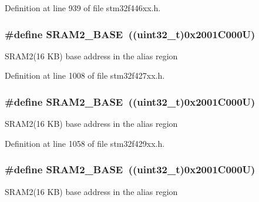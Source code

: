 Definition at line 939 of file stm32f446xx.\+h.

\subsubsection[{\texorpdfstring{S\+R\+A\+M2\+\_\+\+B\+A\+SE}{SRAM2_BASE}}]{\setlength{\rightskip}{0pt plus 5cm}\#define S\+R\+A\+M2\+\_\+\+B\+A\+SE~((uint32\+\_\+t)0x2001\+C000\+U)}\hypertarget{group___peripheral__memory__map_gadbb42a3d0a8a90a79d2146e4014241b1}{}\label{group___peripheral__memory__map_gadbb42a3d0a8a90a79d2146e4014241b1}
S\+R\+A\+M2(16 K\+B) base address in the alias region 

Definition at line 1008 of file stm32f427xx.\+h.

\subsubsection[{\texorpdfstring{S\+R\+A\+M2\+\_\+\+B\+A\+SE}{SRAM2_BASE}}]{\setlength{\rightskip}{0pt plus 5cm}\#define S\+R\+A\+M2\+\_\+\+B\+A\+SE~((uint32\+\_\+t)0x2001\+C000\+U)}\hypertarget{group___peripheral__memory__map_gadbb42a3d0a8a90a79d2146e4014241b1}{}\label{group___peripheral__memory__map_gadbb42a3d0a8a90a79d2146e4014241b1}
S\+R\+A\+M2(16 K\+B) base address in the alias region 

Definition at line 1058 of file stm32f429xx.\+h.

\subsubsection[{\texorpdfstring{S\+R\+A\+M2\+\_\+\+B\+A\+SE}{SRAM2_BASE}}]{\setlength{\rightskip}{0pt plus 5cm}\#define S\+R\+A\+M2\+\_\+\+B\+A\+SE~((uint32\+\_\+t)0x2001\+C000\+U)}\hypertarget{group___peripheral__memory__map_gadbb42a3d0a8a90a79d2146e4014241b1}{}\label{group___peripheral__memory__map_gadbb42a3d0a8a90a79d2146e4014241b1}
S\+R\+A\+M2(16 K\+B) base address in the alias region 

